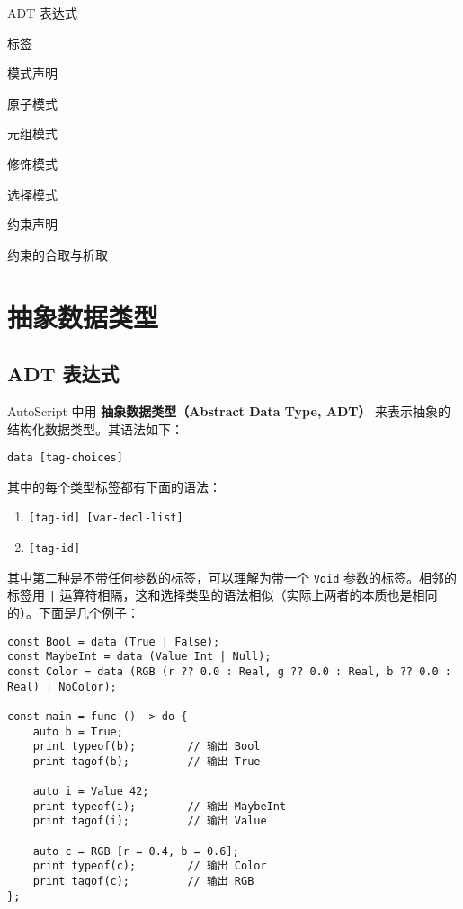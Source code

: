 \begin{introduction}
	\item ADT 表达式
	\item 标签
    \item 模式声明
    \item 原子模式
    \item 元组模式
    \item 修饰模式
    \item 选择模式
    \item 约束声明
    \item 约束的合取与析取
\end{introduction}

\section{抽象数据类型}

\subsection{ADT 表达式}

AutoScript 中用 \textbf{抽象数据类型（Abstract Data Type, ADT）} 来表示抽象的结构化数据类型。其语法如下：

\begin{grammar} \label{grm:adt-expression}
	\lstinline!data [tag-choices]!
\end{grammar}

其中的每个类型标签都有下面的语法：

\begin{grammar} \label{adt-tag-declaration}
\begin{enumerate}
	\item \lstinline![tag-id] [var-decl-list]!
	\item \lstinline![tag-id]!
\end{enumerate}
\end{grammar}

其中第二种是不带任何参数的标签，可以理解为带一个 \lstinline!Void! 参数的标签。相邻的标签用 \lstinline!|! 运算符相隔，这和选择类型的语法相似（实际上两者的本质也是相同的）。下面是几个例子：

\begin{lstlisting}
const Bool = data (True | False);
const MaybeInt = data (Value Int | Null);
const Color = data (RGB (r ?? 0.0 : Real, g ?? 0.0 : Real, b ?? 0.0 : Real) | NoColor);

const main = func () -> do {
	auto b = True;
	print typeof(b);		// 输出 Bool
	print tagof(b);			// 输出 True
	
	auto i = Value 42;
	print typeof(i);		// 输出 MaybeInt
	print tagof(i);			// 输出 Value
	
	auto c = RGB [r = 0.4, b = 0.6];
    print typeof(c);		// 输出 Color
    print tagof(c);			// 输出 RGB
};
\end{lstlisting}

